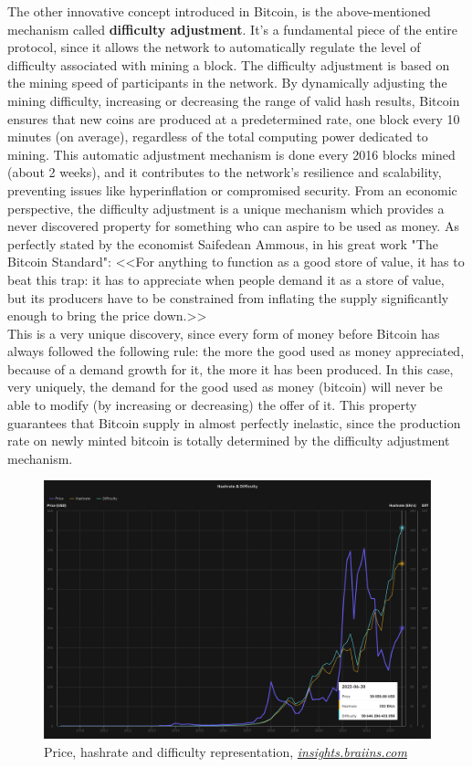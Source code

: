 The other innovative concept introduced in Bitcoin, is the above-mentioned mechanism called \textbf{difficulty adjustment}. It's a fundamental piece of the entire protocol, since it allows the network to automatically regulate the level of difficulty associated with mining a block. The difficulty adjustment is based on the mining speed of participants in the network. By dynamically adjusting the mining difficulty, increasing or decreasing the range of valid hash results, Bitcoin ensures that new coins are produced at a predetermined rate, one block every 10 minutes (on average), regardless of the total computing power dedicated to mining. This automatic adjustment mechanism is done every 2016 blocks mined (about 2 weeks), and it contributes to the network's resilience and scalability, preventing issues like hyperinflation or compromised security. From an economic perspective, the difficulty adjustment is a unique mechanism which provides a never discovered property for something who can aspire to be used as money. As perfectly stated by the economist Saifedean Ammous, in his great work "The Bitcoin Standard":
<<For anything to function as a good store of value, it has to beat this trap: it has to appreciate when people demand it as a store of value, but its producers have to be constrained from inflating the supply significantly enough to bring the price down.>>\cite{bitcoinstandard}\\
This is a very unique discovery, since every form of money before Bitcoin has always followed the following rule: the more the good used as money appreciated, because of a demand growth for it, the more it has been produced. In this case, very uniquely, the demand for the good used as money (bitcoin) will never be able to modify (by increasing or decreasing) the offer of it. This property guarantees that Bitcoin supply in almost perfectly inelastic, since the production rate on newly minted bitcoin is totally determined by the difficulty adjustment mechanism.
\begin{figure}[h!]
\centering
\includegraphics[width=14cm]{Figures/bitcoin/difficulty-2.png}
\caption{Price, hashrate and difficulty representation, \href{https://insights.braiins.com/en}{\textit{insights.braiins.com}}}
\label{fig:difficulty}
\end{figure}

